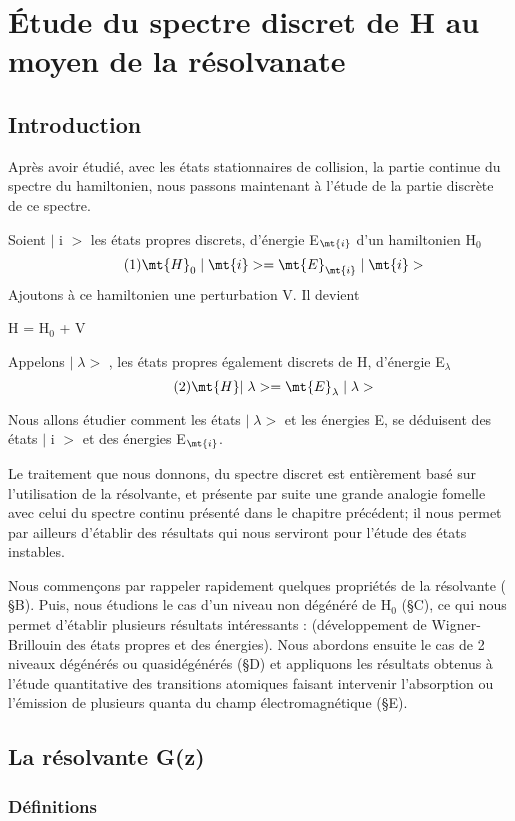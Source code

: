 \chapter{Étude du spectre discret de H au moyen de la résolvanate}
\section{Introduction}
Après avoir étudié, avec les états stationnaires de collision, la
partie continue du spectre du hamiltonien, nous passons maintenant à l'étude
de la partie discrète de ce spectre.

Soient $|$ i $>$ les états propres discrets, d'énergie E$_\mt{i}$ d'un hamiltonien H$_0$
\[
\tag{1}\mt{H}_0\;|\;\mt{i}>=\mt{E}_\mt{i}\;|\;\mt{i}>
\]
Ajoutons à ce hamiltonien une perturbation V. Il devient
\begin{center}
H = H$_0$ + V
\end{center}
Appelons $|\;\lambda>$ , les états propres également discrets de H, d'énergie E$_\lambda$
\[
\tag{2}\mt{H }|\;\lambda>=\mt{E}_\lambda\;|\;\lambda>
\]

Nous allons étudier comment les états $|\;\lambda>$ et les énergies E, se déduisent des
états $|$ i $>$ et des énergies E$_\mt{i}$.

Le traitement que nous donnons, du spectre discret est entièrement basé
sur l'utilisation de la résolvante, et présente par suite une grande analogie fomelle
avec celui du spectre continu présenté dans le chapitre précédent; il nous
permet par ailleurs d'établir des résultats qui nous serviront pour l'étude des
états instables.

Nous commençons par rappeler rapidement quelques propriétés de la résolvante ( \S B). Puis, nous étudions le cas d'un niveau non dégénéré de H$_0$ (\S C), ce qui
nous permet d'établir plusieurs résultats intéressants : (développement de Wigner-Brillouin des états propres et des énergies). Nous abordons ensuite le cas de 2
niveaux dégénérés ou quasidégénérés (\S D) et appliquons les résultats obtenus à
l'étude quantitative des transitions atomiques faisant intervenir l'absorption ou
l'émission de plusieurs quanta du champ électromagnétique (\S E).

\section{La résolvante G(z)}%
\subsection{Définitions}%

